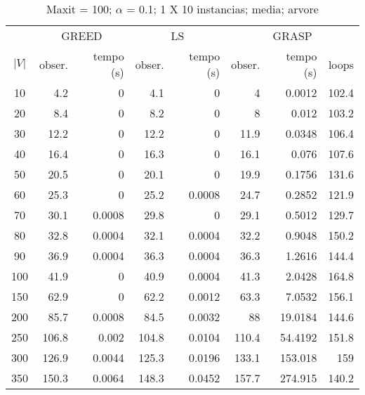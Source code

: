 \documentclass[]{article}
\begin{document}
\begin {table}[h]
\centering
\caption{Maxit = 100; $\alpha$ = 0.1; 1 X 10 instancias; media; arvore}
\begin{small}
	\begin{tabular}{|c|r|r|r|r|r|r|r|}
		\hline
		& \multicolumn{2}{c|}{GREED} & \multicolumn{2}{c|}{LS} & \multicolumn{3}{c|}{GRASP} \\ 
		\cline{2-8}
		$|V|$   &  obser. & tempo (s)  & obser. & tempo (s) & obser. & tempo (s) & loops\\ 
		\hline
		10 & 4.2 & 0 & 4.1 & 0 & 4 & 0.0012 & 102.4 \\ 
		20 & 8.4 & 0 & 8.2 & 0 & 8 & 0.012 & 103.2 \\ 
		30 & 12.2 & 0 & 12.2 & 0 & 11.9 & 0.0348 & 106.4 \\ 
		40 & 16.4 & 0 & 16.3 & 0 & 16.1 & 0.076 & 107.6 \\ 
		50 & 20.5 & 0 & 20.1 & 0 & 19.9 & 0.1756 & 131.6 \\ 
		60 & 25.3 & 0 & 25.2 & 0.0008 & 24.7 & 0.2852 & 121.9 \\ 
		70 & 30.1 & 0.0008 & 29.8 & 0 & 29.1 & 0.5012 & 129.7 \\ 
		80 & 32.8 & 0.0004 & 32.1 & 0.0004 & 32.2 & 0.9048 & 150.2 \\ 
		90 & 36.9 & 0.0004 & 36.3 & 0.0004 & 36.3 & 1.2616 & 144.4 \\ 
		100 & 41.9 & 0 & 40.9 & 0.0004 & 41.3 & 2.0428 & 164.8 \\ 
		150 & 62.9 & 0 & 62.2 & 0.0012 & 63.3 & 7.0532 & 156.1 \\ 
		200 & 85.7 & 0.0008 & 84.5 & 0.0032 & 88 & 19.0184 & 144.6 \\ 
		250 & 106.8 & 0.002 & 104.8 & 0.0104 & 110.4 & 54.4192 & 151.8 \\ 
		300 & 126.9 & 0.0044 & 125.3 & 0.0196 & 133.1 & 153.018 & 159 \\ 
		350 & 150.3 & 0.0064 & 148.3 & 0.0452 & 157.7 & 274.915 & 140.2 \\ 
		\hline
	\end{tabular} \label{}
\end{small}
\end{table}
\end{document}
